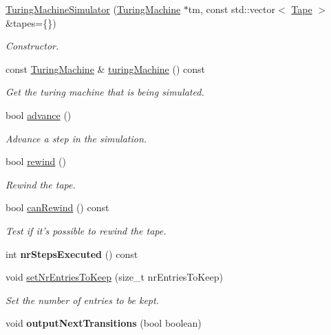 \begin{DoxyCompactItemize}
\item 
\hyperlink{classtum_1_1_turing_machine_simulator_a2d76d2ae081b6d9eb003a1f67c1ebb3f}{\-Turing\-Machine\-Simulator} (\hyperlink{classtum_1_1_turing_machine}{\-Turing\-Machine} $\ast$tm, const std\-::vector$<$ \hyperlink{classtum_1_1_tape}{\-Tape} $>$ \&tapes=\{\})
\begin{DoxyCompactList}\small\item\em \-Constructor. \end{DoxyCompactList}\item 
const \hyperlink{classtum_1_1_turing_machine}{\-Turing\-Machine} \& \hyperlink{classtum_1_1_turing_machine_simulator_a92fb642c4d91ba87d6fcd8bd02751049}{turing\-Machine} () const 
\begin{DoxyCompactList}\small\item\em \-Get the turing machine that is being simulated. \end{DoxyCompactList}\item 
bool \hyperlink{classtum_1_1_turing_machine_simulator_a77a37cfc6df8e9fa39e2dfd12f4c4ab7}{advance} ()
\begin{DoxyCompactList}\small\item\em \-Advance a step in the simulation. \end{DoxyCompactList}\item 
bool \hyperlink{classtum_1_1_turing_machine_simulator_a3e21921aab0370e84b316d36938f50fd}{rewind} ()
\begin{DoxyCompactList}\small\item\em \-Rewind the tape. \end{DoxyCompactList}\item 
bool \hyperlink{classtum_1_1_turing_machine_simulator_ac1885eb76ee49d35ca08204d0c80a460}{can\-Rewind} () const 
\begin{DoxyCompactList}\small\item\em \-Test if it's possible to rewind the tape. \end{DoxyCompactList}\item 
\hypertarget{classtum_1_1_turing_machine_simulator_a8b8503f890a430bc91b637f5051fbfbd}{int {\bfseries nr\-Steps\-Executed} () const }\label{classtum_1_1_turing_machine_simulator_a8b8503f890a430bc91b637f5051fbfbd}

\item 
void \hyperlink{classtum_1_1_turing_machine_simulator_a72dbe7e93d8e0b1309b64b5aa58663fb}{set\-Nr\-Entries\-To\-Keep} (size\-\_\-t nr\-Entries\-To\-Keep)
\begin{DoxyCompactList}\small\item\em \-Set the number of entries to be kept. \end{DoxyCompactList}\item 
\hypertarget{classtum_1_1_turing_machine_simulator_afe75796578eeebfef4b50e2b90d04cd2}{void {\bfseries output\-Next\-Transitions} (bool boolean)}\label{classtum_1_1_turing_machine_simulator_afe75796578eeebfef4b50e2b90d04cd2}


\end{DoxyCompactItemize}
